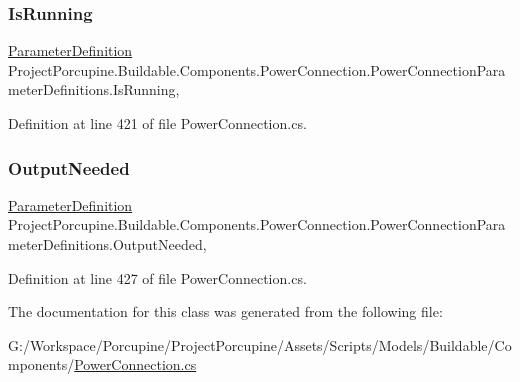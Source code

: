 \subsubsection{\texorpdfstring{Is\+Running}{IsRunning}}
{\footnotesize\ttfamily \hyperlink{class_project_porcupine_1_1_buildable_1_1_components_1_1_buildable_component_1_1_parameter_definition}{Parameter\+Definition} Project\+Porcupine.\+Buildable.\+Components.\+Power\+Connection.\+Power\+Connection\+Parameter\+Definitions.\+Is\+Running\hspace{0.3cm}{\ttfamily [get]}, {\ttfamily [set]}}



Definition at line 421 of file Power\+Connection.\+cs.

\mbox{\label{class_project_porcupine_1_1_buildable_1_1_components_1_1_power_connection_1_1_power_connection_parameter_definitions_af874844d2f05d28fbddf234d0b508562}} 
\subsubsection{\texorpdfstring{Output\+Needed}{OutputNeeded}}
{\footnotesize\ttfamily \hyperlink{class_project_porcupine_1_1_buildable_1_1_components_1_1_buildable_component_1_1_parameter_definition}{Parameter\+Definition} Project\+Porcupine.\+Buildable.\+Components.\+Power\+Connection.\+Power\+Connection\+Parameter\+Definitions.\+Output\+Needed\hspace{0.3cm}{\ttfamily [get]}, {\ttfamily [set]}}



Definition at line 427 of file Power\+Connection.\+cs.



The documentation for this class was generated from the following file\+:\begin{DoxyCompactItemize}
\item 
G\+:/\+Workspace/\+Porcupine/\+Project\+Porcupine/\+Assets/\+Scripts/\+Models/\+Buildable/\+Components/\hyperlink{_power_connection_8cs}{Power\+Connection.\+cs}\end{DoxyCompactItemize}
